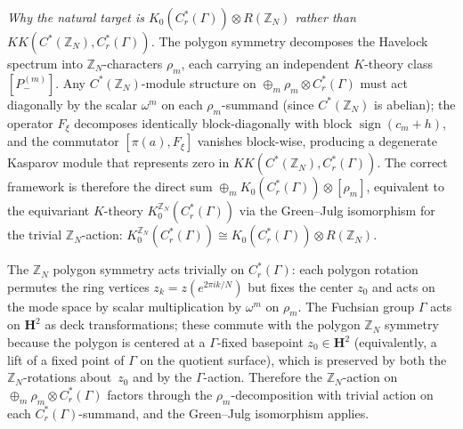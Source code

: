 \noindent
\emph{Why the natural target is $K_0(C^*_r(\Gamma)) \otimes R(\mathbb{Z}_N)$
rather than $KK(C^*(\mathbb{Z}_N), C^*_r(\Gamma))$.}
The polygon symmetry decomposes the Havelock spectrum into
$\mathbb{Z}_N$-characters $\rho_m$, each carrying an independent
$K$-theory class $[P_-^{(m)}]$.
Any $C^*(\mathbb{Z}_N)$-module structure on
$\oplus_m \rho_m \otimes C^*_r(\Gamma)$ must act diagonally by the
scalar $\omega^m$ on each $\rho_m$-summand (since
$C^*(\mathbb{Z}_N)$ is abelian); the operator $F_\xi$ decomposes
identically block-diagonally with block $\operatorname{sign}(c_m + h)$,
and the commutator $[\pi(a), F_\xi]$ vanishes block-wise,
producing a degenerate Kasparov module that represents
zero in $KK(C^*(\mathbb{Z}_N), C^*_r(\Gamma))$.
The correct framework is therefore the direct sum
$\oplus_m K_0(C^*_r(\Gamma)) \otimes [\rho_m]$,
equivalent to the equivariant $K$-theory
$K_0^{\mathbb{Z}_N}(C^*_r(\Gamma))$ via the Green--Julg
isomorphism for the trivial $\mathbb{Z}_N$-action:
$K_0^{\mathbb{Z}_N}(C^*_r(\Gamma))
\cong K_0(C^*_r(\Gamma)) \otimes R(\mathbb{Z}_N)$.

\begin{lemma}
\label{lem:trivial-action}
The $\mathbb{Z}_N$ polygon symmetry acts trivially on
$C^*_r(\Gamma)$: each polygon rotation permutes the
ring vertices $z_k = z(e^{2\pi ik/N})$ but fixes the
center $z_0$ and acts on the mode space by scalar
multiplication by $\omega^m$ on $\rho_m$.
The Fuchsian group $\Gamma$ acts on $\mathbf{H}^2$ as
deck transformations; these commute with the polygon
$\mathbb{Z}_N$ symmetry because the polygon is centered
at a $\Gamma$-fixed basepoint $z_0 \in \mathbf{H}^2$
(equivalently, a lift of a fixed point of $\Gamma$ on
the quotient surface), which is preserved by both the
$\mathbb{Z}_N$-rotations about~$z_0$ and by the
$\Gamma$-action.
Therefore the $\mathbb{Z}_N$-action on
$\oplus_m \rho_m \otimes C^*_r(\Gamma)$
factors through the $\rho_m$-decomposition with
trivial action on each $C^*_r(\Gamma)$-summand,
and the Green--Julg isomorphism applies.
\end{lemma}

